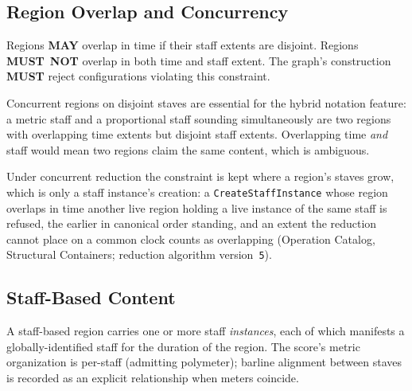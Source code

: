 \documentclass[11pt,letterpaper]{report}
\newcommand{\sectionsc}[1]{{\addfontfeatures{Letters=SmallCaps}#1}}
\newcounter{requirement}[chapter]
\newcommand{\MUST}{\textbf{MUST}}
\newcommand{\MUSTNOT}{\textbf{MUST}\nobreak\ \textbf{NOT}}
\newcommand{\MAY}{\textbf{MAY}}
\begin{document}
\subsection{Region Overlap and Concurrency}

\begin{requirement}
  \label{req:graph:region-overlap-constraint}
  Regions \MAY{} overlap in time if their staff extents are disjoint.
  Regions \MUSTNOT{} overlap in both time and staff extent. The
  graph's construction \MUST{} reject configurations violating this
  constraint.
\end{requirement}

\begin{rationale}
  Concurrent regions on disjoint staves are essential for the hybrid
  notation feature: a metric staff and a proportional staff sounding
  simultaneously are two regions with overlapping time extents but
  disjoint staff extents. Overlapping time \emph{and} staff would mean
  two regions claim the same content, which is ambiguous.
\end{rationale}

Under concurrent reduction the constraint is kept where a region's staves
grow, which is only a staff instance's creation: a \texttt{CreateStaffInstance}
whose region overlaps in time another live region holding a live instance of
the same staff is refused, the earlier in canonical order standing, and an
extent the reduction cannot place on a common clock counts as overlapping
(Operation Catalog, \sectionsc{Structural Containers}; reduction algorithm
version~\texttt{5}).

\subsection{Staff-Based Content}

A staff-based region carries one or more staff \emph{instances}, each
of which manifests a globally-identified staff for the duration of the
region. The score's metric organization is per-staff (admitting
polymeter); barline alignment between staves is recorded as an
explicit relationship when meters coincide.
\end{document}
